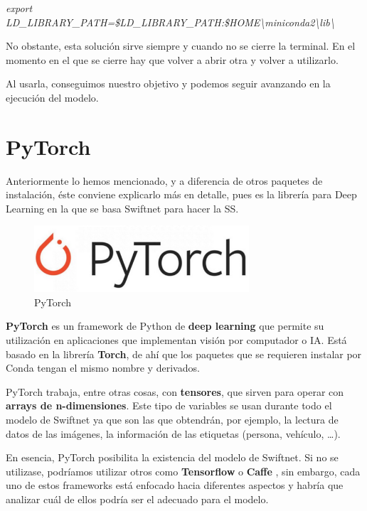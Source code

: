 \begin{center}
\textit{export LD\_LIBRARY\_PATH=\$LD\_LIBRARY\_PATH:\$HOME\textbackslash{miniconda2}\textbackslash{lib}\textbackslash{}}
\end{center}

No obstante, esta solución sirve siempre y cuando no se cierre la terminal. En el momento en el que se cierre hay que volver a abrir otra y volver a utilizarlo.

Al usarla, conseguimos nuestro objetivo y podemos seguir avanzando en la ejecución del modelo.

\section{PyTorch}

Anteriormente lo hemos mencionado, y a diferencia de otros paquetes de instalación, éste conviene explicarlo más en detalle, pues es la librería para Deep Learning en la que se basa Swiftnet para hacer la \ac{SS}.

\begin{figure}[H]
  \centering
  \includegraphics[width=8cm]{Figuras/PyTorch.eps}
  \caption{PyTorch}
\end{figure}

\textbf{PyTorch} \cite{pytorch} es un framework de Python de \textbf{deep learning} que permite su utilización en aplicaciones que implementan visión por computador o IA. Está basado en la librería \textbf{Torch}, de ahí que los paquetes que se requieren instalar por Conda tengan el mismo nombre y derivados.

PyTorch trabaja, entre otras cosas, con \textbf{tensores}, que sirven para operar con \textbf{arrays de n-dimensiones}. Este tipo de variables se usan durante todo el modelo de Swiftnet ya que son las que obtendrán, por ejemplo, la lectura de datos de las imágenes, la información de las etiquetas (persona, vehículo, \ldots).

En esencia, PyTorch posibilita la existencia del modelo de Swiftnet. Si no se utilizase, podríamos utilizar otros como \textbf{Tensorflow} \cite{tensorflow} o \textbf{Caffe} \cite{caffe}, sin embargo, cada uno de estos frameworks está enfocado hacia diferentes aspectos y habría que analizar cuál de ellos podría ser el adecuado para el modelo. 

